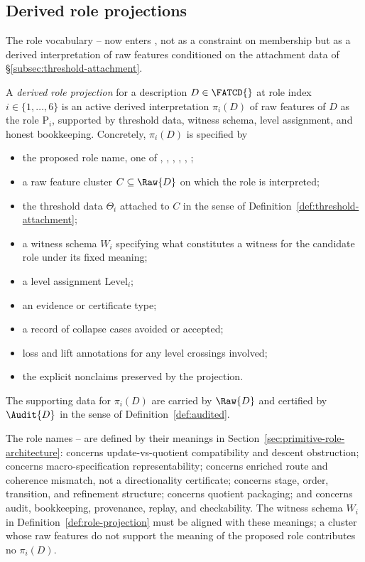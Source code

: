 \subsection{Derived role projections}\label{subsec:derived-role-projections}

The role vocabulary \Pone{}--\Psix{} now enters \FATCD{}, not as a
constraint on membership but as a derived interpretation of raw
features conditioned on the attachment data of
\S\ref{subsec:threshold-attachment}.

\begin{definition}\label{def:role-projection}
A \emph{derived role projection} for a description \(D \in \FATCD{}\) at
role index \(i \in \{1,\ldots,6\}\) is an active derived interpretation
\(\pi_i(D)\) of raw features of \(D\) as the role \(\mathrm{P}_i\), supported
by threshold data, witness schema, level assignment, and honest bookkeeping.
Concretely, \(\pi_i(D)\) is specified by
\begin{itemize}[topsep=2pt,itemsep=1pt]
  \item the proposed role name, one of \Pone{}, \Ptwo{}, \Pthree{},
    \Pfour{}, \Pfive{}, \Psix{};
  \item a raw feature cluster \(C \subseteq \Raw{D}\) on which the role is
    interpreted;
  \item the threshold data \(\Theta_i\) attached to \(C\) in the sense of
    Definition~\ref{def:threshold-attachment};
  \item a witness schema \(W_i\) specifying what constitutes a witness for
    the candidate role under its fixed meaning;
  \item a level assignment \(\mathrm{Level}_i\);
  \item an evidence or certificate type;
  \item a record of collapse cases avoided or accepted;
  \item loss and lift annotations for any level crossings involved;
  \item the explicit nonclaims preserved by the projection.
\end{itemize}
The supporting data for \(\pi_i(D)\) are carried by \(\Raw{D}\) and certified
by \(\Audit{D}\) in the sense of Definition~\ref{def:audited}.
\end{definition}

\begin{remark}\label{rem:fixed-role-meanings}
The role names \Pone{}--\Psix{} are defined by their meanings in
Section~\ref{sec:primitive-role-architecture}: \Pone{} concerns
update-vs-quotient compatibility and descent obstruction; \Ptwo{} concerns
macro-specification representability; \Pthree{} concerns enriched
route and coherence mismatch, not a directionality certificate; \Pfour{}
concerns stage, order, transition, and refinement structure; \Pfive{}
concerns quotient packaging; and
\Psix{} concerns audit, bookkeeping, provenance, replay, and checkability.
The witness schema \(W_i\) in Definition~\ref{def:role-projection} must be
aligned with these meanings; a cluster whose raw features do not support the
meaning of the proposed role contributes no \(\pi_i(D)\).
\end{remark}

